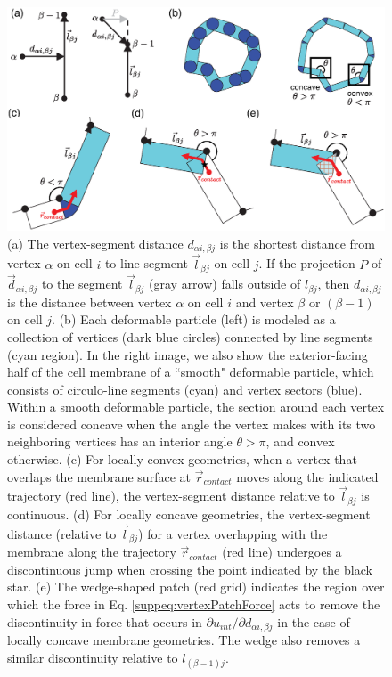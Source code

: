 \documentclass[%
 reprint,
superscriptaddress,
 amsmath,amssymb,
pre,
]{revtex4-2}
\begin{document}
\begin{figure}
    \centering
    \includegraphics[width=\linewidth]{suppFigures/SuppSmoothSchematic.eps}
\caption{(a) The vertex-segment distance $d_{\alpha i, \beta j}$ is the shortest distance from vertex $\alpha$ on cell $i$ to line segment ${\vec l}_{\beta j}$ on cell $j$. If the projection $P$ of ${\vec d}_{\alpha i, \beta j}$ to the segment ${\vec l}_{\beta j}$ (gray arrow) falls outside of $l_{\beta j}$, then $d_{\alpha i, \beta j}$ is the distance between vertex $\alpha$ on cell $i$ and vertex $\beta$ or $(\beta-1)$ on cell $j$. (b) Each deformable particle (left) is modeled as a collection of vertices (dark blue circles) connected by line segments (cyan region). In the right image, we also show the exterior-facing half of the cell membrane of a ``smooth" deformable particle, which consists of circulo-line segments (cyan) and vertex sectors (blue). Within a smooth deformable particle, the section around each vertex is considered concave when the angle the vertex makes with its two neighboring vertices has an interior angle $\theta > \pi$, and convex otherwise. (c) For locally convex geometries, when a vertex that overlaps the membrane surface at $\vec{r}_{contact}$ moves along the indicated trajectory (red line), the  vertex-segment distance relative to ${\vec l}_{\beta j}$ is continuous. (d) For locally concave geometries, the vertex-segment distance (relative to ${\vec l}_{\beta j}$) for a vertex overlapping with the membrane along the trajectory $\vec{r}_{contact}$ (red line) undergoes a discontinuous jump when crossing the point indicated by the black star. (e) The wedge-shaped patch (red grid) indicates the region over which the force in Eq. \ref{suppeq:vertexPatchForce} acts to remove the discontinuity in force that occurs in $\partial u_{int}/\partial d_{\alpha i, \beta j}$ in the case of locally concave membrane geometries. The wedge also removes a similar discontinuity relative to $l_{(\beta - 1)j}$.
}
\label{suppfig:smooth}
\end{figure}
\end{document}
